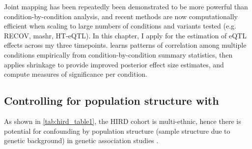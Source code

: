 Joint mapping has been repeatedly been demonstrated to be more powerful than condition-by-condition analysis,
and recent methods are now computationally efficient when scaling to large numbers of conditions and variants tested (e.g. RECOV\autocite{duong2017ApplyingMetaanalysisGenotypetissue}, mashr\autocite{urbut2018FlexibleStatisticalMethods}, HT-eQTL\autocite{li2018HTeQTLIntegrativeExpression}).
In this chapter, I apply \autocite{urbut2018FlexibleStatisticalMethods} for the estimation of \gls{eQTL} effects across my three timepoints.
 learns patterns of correlation among multiple conditions empirically from condition-by-condition summary statistics,
then applies shrinkage to provide improved posterior effect size estimates,
and compute measures of significance per condition. 


\subsection{Controlling for population structure with }

As shown in \cref{tab:hird_table1}, the \gls{HIRD} cohort is multi-ethnic, hence there is potential for confounding by population structure (sample structure due to genetic background) in genetic association studies \autocite{price2006PrincipalComponentsAnalysis,eu-ahsunthornwattana2014ComparisonMethodsAccount}.

